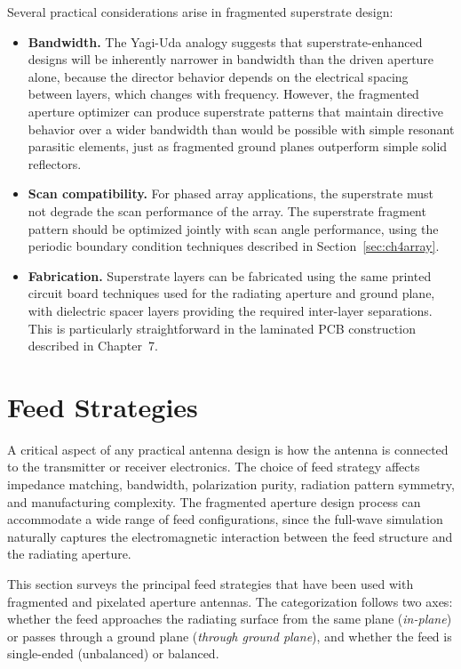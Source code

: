 Several practical considerations arise in fragmented superstrate design:

\begin{itemize}
\item \textbf{Bandwidth.}  The Yagi-Uda analogy suggests that superstrate-enhanced designs will be inherently narrower in bandwidth than the driven aperture alone, because the director behavior depends on the electrical spacing between layers, which changes with frequency.  However, the fragmented aperture optimizer can produce superstrate patterns that maintain directive behavior over a wider bandwidth than would be possible with simple resonant parasitic elements, just as fragmented ground planes outperform simple solid reflectors.

\item \textbf{Scan compatibility.}  For phased array applications, the superstrate must not degrade the scan performance of the array.  The superstrate fragment pattern should be optimized jointly with scan angle performance, using the periodic boundary condition techniques described in Section~\ref{sec:ch4array}.

\item \textbf{Fabrication.}  Superstrate layers can be fabricated using the same printed circuit board techniques used for the radiating aperture and ground plane, with dielectric spacer layers providing the required inter-layer separations.  This is particularly straightforward in the laminated PCB construction described in Chapter~7.
\end{itemize}

\section{Feed Strategies}
\label{sec:ch4feeds}

A critical aspect of any practical antenna design is how the antenna is connected to the transmitter or receiver electronics.  The choice of feed strategy affects impedance matching, bandwidth, polarization purity, radiation pattern symmetry, and manufacturing complexity.  The fragmented aperture design process can accommodate a wide range of feed configurations, since the full-wave simulation naturally captures the electromagnetic interaction between the feed structure and the radiating aperture.

This section surveys the principal feed strategies that have been used with fragmented and pixelated aperture antennas.  The categorization follows two axes: whether the feed approaches the radiating surface from the same plane (\emph{in-plane}) or passes through a ground plane (\emph{through ground plane}), and whether the feed is single-ended (unbalanced) or balanced.

